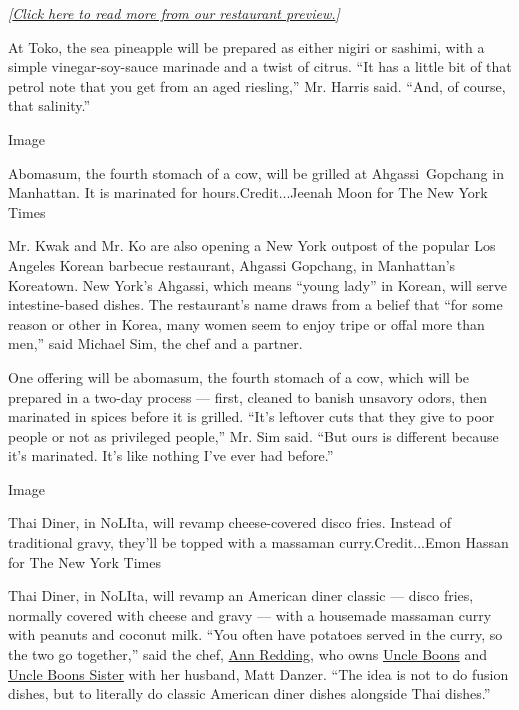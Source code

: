 \emph{{[}}\href{https://www.nytimes3xbfgragh.onion/2019/09/03/dining/fall-restaurant-preview-nyc.html}{\emph{Click
here to read more from our restaurant preview.}}\emph{{]}}

At Toko, the sea pineapple will be prepared as either nigiri or sashimi,
with a simple vinegar-soy-sauce marinade and a twist of citrus. ``It has
a little bit of that petrol note that you get from an aged riesling,''
Mr. Harris said. ``And, of course, that salinity.''

Image

Abomasum, the fourth stomach of a cow, will be grilled at
Ahgassi~Gopchang in Manhattan. It is marinated for hours.Credit...Jeenah
Moon for The New York Times

Mr. Kwak and Mr. Ko are also opening a New York outpost of the popular
Los Angeles Korean barbecue restaurant, Ahgassi Gopchang, in Manhattan's
Koreatown. New York's Ahgassi, which means ``young lady'' in Korean,
will serve intestine-based dishes. The restaurant's name draws from a
belief that ``for some reason or other in Korea, many women seem to
enjoy tripe or offal more than men,'' said Michael Sim, the chef and a
partner.

One offering will be abomasum, the fourth stomach of a cow, which will
be prepared in a two-day process --- first, cleaned to banish unsavory
odors, then marinated in spices before it is grilled. ``It's leftover
cuts that they give to poor people or not as privileged people,'' Mr.
Sim said. ``But ours is different because it's marinated. It's like
nothing I've ever had before.''

Image

Thai Diner, in NoLIta, will revamp cheese-covered disco fries. Instead
of traditional gravy, they'll be topped with a massaman
curry.Credit...Emon Hassan for The New York Times

Thai Diner, in NoLIta, will revamp an American diner classic --- disco
fries, normally covered with cheese and gravy --- with a housemade
massaman curry with peanuts and coconut milk. ``You often have potatoes
served in the curry, so the two go together,'' said the chef,
\href{https://www.nytimes3xbfgragh.onion/2013/09/11/dining/the-family-apron.html}{Ann
Redding}, who owns
\href{https://www.nytimes3xbfgragh.onion/2013/07/03/dining/reviews/restaurant-review-uncle-boons-in-nolita.html}{Uncle
Boons} and \href{https://www.uncleboonssister.com/}{Uncle Boons Sister}
with her husband, Matt Danzer. ``The idea is not to do fusion dishes,
but to literally do classic American diner dishes alongside Thai
dishes.''

